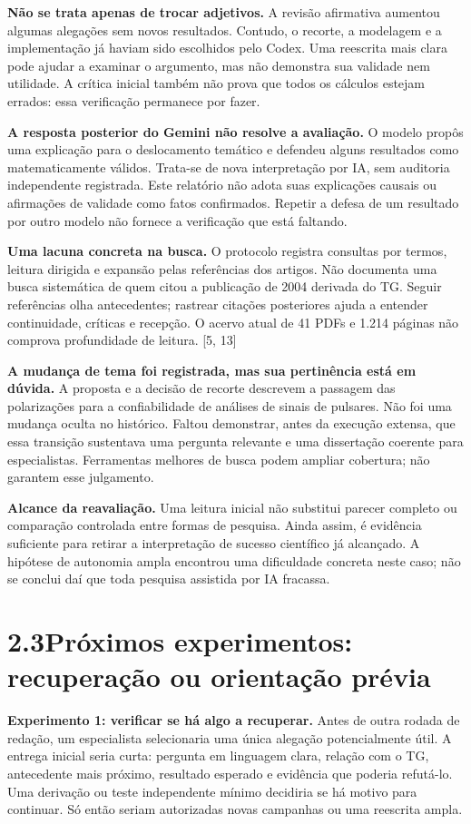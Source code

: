 \documentclass[11pt,a4paper]{article}
\newcommand{\fonte}[1]{{\small\color{navy}[#1]}}
\newcommand{\titulo}[2]{\section*{\color{navy}#1\quad #2}}
\begin{document}
\textbf{Não se trata apenas de trocar adjetivos.} A revisão afirmativa aumentou algumas alegações sem novos resultados. Contudo, o recorte, a modelagem e a implementação já haviam sido escolhidos pelo Codex. Uma reescrita mais clara pode ajudar a examinar o argumento, mas não demonstra sua validade nem utilidade. A crítica inicial também não prova que todos os cálculos estejam errados: essa verificação permanece por fazer.

\textbf{A resposta posterior do Gemini não resolve a avaliação.} O modelo propôs uma explicação para o deslocamento temático e defendeu alguns resultados como matematicamente válidos. Trata-se de nova interpretação por IA, sem auditoria independente registrada. Este relatório não adota suas explicações causais ou afirmações de validade como fatos confirmados. Repetir a defesa de um resultado por outro modelo não fornece a verificação que está faltando.

\textbf{Uma lacuna concreta na busca.} O protocolo registra consultas por termos, leitura dirigida e expansão pelas referências dos artigos. Não documenta uma busca sistemática de quem citou a publicação de 2004 derivada do TG. Seguir referências olha antecedentes; rastrear citações posteriores ajuda a entender continuidade, críticas e recepção. O acervo atual de 41 PDFs e 1.214 páginas não comprova profundidade de leitura. \fonte{5, 13}

\textbf{A mudança de tema foi registrada, mas sua pertinência está em dúvida.} A proposta e a decisão de recorte descrevem a passagem das polarizações para a confiabilidade de análises de sinais de pulsares. Não foi uma mudança oculta no histórico. Faltou demonstrar, antes da execução extensa, que essa transição sustentava uma pergunta relevante e uma dissertação coerente para especialistas. Ferramentas melhores de busca podem ampliar cobertura; não garantem esse julgamento.

\textbf{Alcance da reavaliação.} Uma leitura inicial não substitui parecer completo ou comparação controlada entre formas de pesquisa. Ainda assim, é evidência suficiente para retirar a interpretação de sucesso científico já alcançado. A hipótese de autonomia ampla encontrou uma dificuldade concreta neste caso; não se conclui daí que toda pesquisa assistida por IA fracassa.
\newpage

\titulo{2.3}{Próximos experimentos: recuperação ou orientação prévia}
\textbf{Experimento 1: verificar se há algo a recuperar.} Antes de outra rodada de redação, um especialista selecionaria uma única alegação potencialmente útil. A entrega inicial seria curta: pergunta em linguagem clara, relação com o TG, antecedente mais próximo, resultado esperado e evidência que poderia refutá-lo. Uma derivação ou teste independente mínimo decidiria se há motivo para continuar. Só então seriam autorizadas novas campanhas ou uma reescrita ampla.
\end{document}
